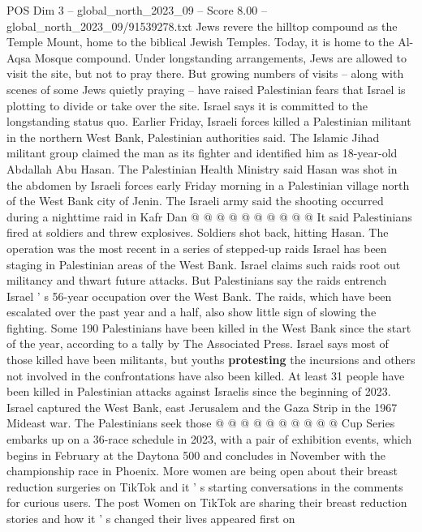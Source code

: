 \begin{textsample}{POS Dim 3 – global\_north\_2023\_09 – Score 8.00 – global\_north\_2023\_09/91539278.txt}
Jews revere the hilltop compound as the Temple Mount, home to the biblical Jewish Temples.
Today, it is home to the Al-Aqsa Mosque compound.
Under longstanding arrangements, Jews are allowed to visit the site, but not to pray there.
But growing numbers of visits -- along with scenes of some Jews quietly praying -- have raised Palestinian fears that Israel is plotting to divide or take over the site.
Israel says it is committed to the longstanding status quo.
Earlier Friday, Israeli forces killed a Palestinian militant in the northern West Bank, Palestinian authorities said.
The Islamic Jihad militant group claimed the man as its fighter and identified him as 18-year-old Abdallah Abu Hasan.
The Palestinian Health Ministry said Hasan was shot in the abdomen by Israeli forces early Friday morning in a Palestinian village north of the West Bank city of Jenin.
The Israeli army said the shooting occurred during a nighttime raid in Kafr Dan @ @ @ @ @ @ @ @ @ @ It said Palestinians fired at soldiers and threw explosives.
Soldiers shot back, hitting Hasan.
The operation was the most recent in a series of stepped-up raids Israel has been staging in Palestinian areas of the West Bank.
Israel claims such raids root out militancy and thwart future attacks.
But Palestinians say the raids entrench Israel ' s 56-year occupation over the West Bank.
The raids, which have been escalated over the past year and a half, also show little sign of slowing the fighting.
Some 190 Palestinians have been killed in the West Bank since the start of the year, according to a tally by The Associated Press.
Israel says most of those killed have been militants, but youths \textbf{protesting} the incursions and others not involved in the confrontations have also been killed.
At least 31 people have been killed in Palestinian attacks against Israelis since the beginning of 2023.
Israel captured the West Bank, east Jerusalem and the Gaza Strip in the 1967 Mideast war.
The Palestinians seek those @ @ @ @ @ @ @ @ @ @ Cup Series embarks up on a 36-race schedule in 2023, with a pair of exhibition events, which begins in February at the Daytona 500 and concludes in November with the championship race in Phoenix.
More women are being open about their breast reduction surgeries on TikTok and it ' s starting conversations in the comments for curious users.
The post Women on TikTok are sharing their breast reduction stories and how it ' s changed their lives appeared first on

\end{textsample}
